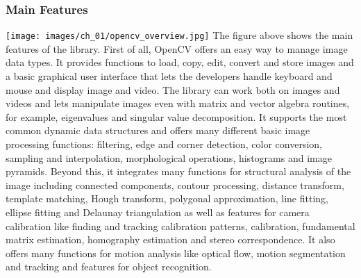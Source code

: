 	\subsubsection*{Main Features}
		\texttt{[image: images/ch\_01/opencv\_overview.jpg]}
	The figure above shows the main features of the library. First of all, OpenCV offers an easy way to manage image data types. It provides functions to load, copy, edit, convert and store images and a basic graphical user interface that lets the developers handle keyboard and mouse and display image and video. The library can work both on images and videos and lets manipulate images even with matrix and vector algebra routines, for example, eigenvalues and singular value decomposition. It supports the most common dynamic data structures and offers many different basic image processing functions: filtering, edge and corner detection, color conversion, sampling and interpolation, morphological operations, histograms and image pyramids. Beyond this, it integrates many functions for structural analysis of the image including connected components, contour processing, distance transform, template matching, Hough transform, polygonal approximation, line fitting, ellipse fitting and Delaunay triangulation as well as features for camera calibration like finding and tracking calibration patterns, calibration, fundamental matrix estimation, homography estimation and stereo correspondence. It also offers many functions for motion analysis like optical flow, motion segmentation and tracking and features for object recognition.